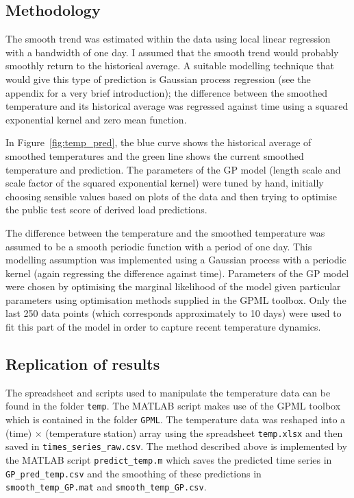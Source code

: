 \documentclass[preprint,authoryear,12pt]{elsarticle}
\begin{document}
\subsection{Methodology}

The smooth trend was estimated within the data using local linear regression \citep[e.g. chapter 6 of][]{Hastie2009} with a bandwidth of one day.
I assumed that the smooth trend would probably smoothly return to the historical average.
A suitable modelling technique that would give this type of prediction is Gaussian process regression \citep[e.g.][]{Rasmussen2006} (see the appendix for a very brief introduction); the difference between the smoothed temperature and its historical average was regressed against time using a squared exponential kernel and zero mean function.

In Figure~\ref{fig:temp_pred}, the blue curve shows the historical average of smoothed temperatures and the green line shows the current smoothed temperature and prediction.
The parameters of the GP model (length scale and scale factor of the squared exponential kernel) were tuned by hand, initially choosing sensible values based on plots of the data and then trying to optimise the public test score of derived load predictions.

The difference between the temperature and the smoothed temperature was assumed to be a smooth periodic function with a period of one day.
This modelling assumption was implemented using a Gaussian process with a periodic kernel (again regressing the difference against time).
Parameters of the GP model were chosen by optimising the marginal likelihood of the model given particular parameters using optimisation methods supplied in the GPML toolbox\footnotemark.
Only the last 250 data points (which corresponds approximately to 10 days) were used to fit this part of the model in order to capture recent temperature dynamics.

\subsection{Replication of results}

The spreadsheet and scripts used to manipulate the temperature data can be found in the folder \texttt{temp}.
The MATLAB script makes use of the GPML toolbox which is contained in the folder \texttt{GPML}.
The temperature data was reshaped into a (time) $\times$ (temperature station) array using the spreadsheet \texttt{temp.xlsx} and then saved in \texttt{times\_series\_raw.csv}.
The method described above is implemented by the MATLAB script \texttt{predict\_temp.m} which saves the predicted time series in \texttt{GP\_pred\_temp.csv} and the smoothing of these predictions in \texttt{smooth\_temp\_GP.mat} and \texttt{smooth\_temp\_GP.csv}.
\end{document}
